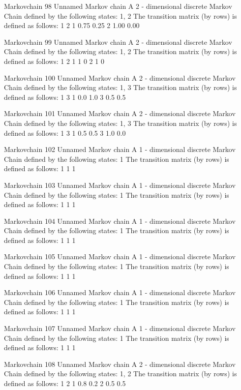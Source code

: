 \documentclass[
  nojss]{jss}
\begin{document}
\begin{CodeChunk}
\begin{CodeOutput}
Markovchain  98 
Unnamed Markov chain 
 A  2 - dimensional discrete Markov Chain defined by the following states: 
 1, 2 
 The transition matrix  (by rows)  is defined as follows: 
     1    2
1 0.75 0.25
2 1.00 0.00

Markovchain  99 
Unnamed Markov chain 
 A  2 - dimensional discrete Markov Chain defined by the following states: 
 1, 2 
 The transition matrix  (by rows)  is defined as follows: 
  1 2
1 1 0
2 1 0

Markovchain  100 
Unnamed Markov chain 
 A  2 - dimensional discrete Markov Chain defined by the following states: 
 1, 3 
 The transition matrix  (by rows)  is defined as follows: 
    1   3
1 0.0 1.0
3 0.5 0.5

Markovchain  101 
Unnamed Markov chain 
 A  2 - dimensional discrete Markov Chain defined by the following states: 
 1, 3 
 The transition matrix  (by rows)  is defined as follows: 
    1   3
1 0.5 0.5
3 1.0 0.0

Markovchain  102 
Unnamed Markov chain 
 A  1 - dimensional discrete Markov Chain defined by the following states: 
 1 
 The transition matrix  (by rows)  is defined as follows: 
  1
1 1

Markovchain  103 
Unnamed Markov chain 
 A  1 - dimensional discrete Markov Chain defined by the following states: 
 1 
 The transition matrix  (by rows)  is defined as follows: 
  1
1 1

Markovchain  104 
Unnamed Markov chain 
 A  1 - dimensional discrete Markov Chain defined by the following states: 
 1 
 The transition matrix  (by rows)  is defined as follows: 
  1
1 1

Markovchain  105 
Unnamed Markov chain 
 A  1 - dimensional discrete Markov Chain defined by the following states: 
 1 
 The transition matrix  (by rows)  is defined as follows: 
  1
1 1

Markovchain  106 
Unnamed Markov chain 
 A  1 - dimensional discrete Markov Chain defined by the following states: 
 1 
 The transition matrix  (by rows)  is defined as follows: 
  1
1 1

Markovchain  107 
Unnamed Markov chain 
 A  1 - dimensional discrete Markov Chain defined by the following states: 
 1 
 The transition matrix  (by rows)  is defined as follows: 
  1
1 1

Markovchain  108 
Unnamed Markov chain 
 A  2 - dimensional discrete Markov Chain defined by the following states: 
 1, 2 
 The transition matrix  (by rows)  is defined as follows: 
    1   2
1 0.8 0.2
2 0.5 0.5


\end{CodeOutput}
\end{CodeChunk}
\end{document}
